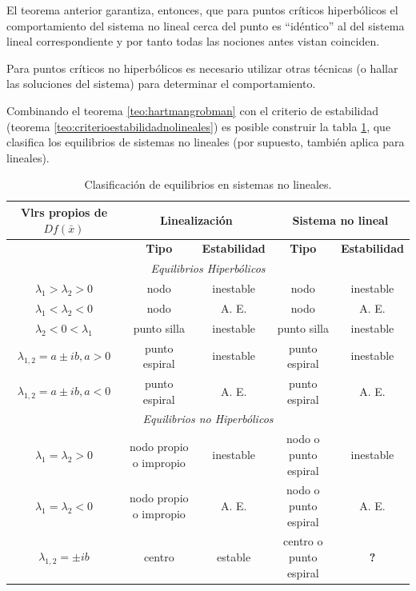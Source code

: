 El teorema anterior garantiza, entonces, que para puntos críticos hiperbólicos el comportamiento del sistema no lineal cerca del punto es ``idéntico'' al del sistema lineal correspondiente y por tanto todas las nociones antes vistan coinciden.

Para puntos críticos no hiperbólicos es necesario utilizar otras técnicas (o hallar las soluciones del sistema) para determinar el comportamiento.

Combinando el teorema \ref{teo:hartmangrobman} con el criterio de estabilidad (teorema \ref{teo:criterioestabilidadnolineales}) es posible construir la tabla \ref{tab:clasificacionequilibrios}, que clasifica los equilibrios de sistemas no lineales (por supuesto, también aplica para lineales).

\begin{table}[ht!]
{\small
	\begin{tabular}{|c|c|c|c|c|}
		\hline
		\textbf{Vlrs propios de $Df(\bar{x})$} & \multicolumn{2}{|c|}{\textbf{Linealización}} & \multicolumn{2}{|c|}{\textbf{Sistema no lineal}} \\
		\hline
		 & \textbf{Tipo} &\textbf{Estabilidad} & \textbf{Tipo} & \textbf{Estabilidad} \\
		\hline
		\multicolumn{5}{|c|}{\textit{Equilibrios Hiperbólicos}} \\
		\hline
		$\lambda_1 > \lambda_2 > 0$ & nodo & inestable & nodo & inestable \\
		$\lambda_1 < \lambda_2 < 0$ & nodo & A. E. & nodo & A. E. \\
		$\lambda_2 < 0 < \lambda_1$ & punto silla & inestable & punto silla & inestable \\
		$\lambda_{1,2} = a \pm ib, a > 0$ & punto espiral & inestable & punto espiral & inestable \\
		$\lambda_{1,2} = a \pm ib, a < 0$ & punto espiral & A. E. & punto espiral & A. E. \\

		\hline
		\multicolumn{5}{|c|}{\textit{Equilibrios no Hiperbólicos}} \\
		\hline
		$\lambda_1 = \lambda_2 >0$ & nodo propio o impropio & inestable & nodo o punto espiral & inestable \\
		$\lambda_1 = \lambda_2 < 0$ & nodo propio o impropio & A. E. & nodo o punto espiral & A. E. \\
		$\lambda_{1,2} = \pm ib$ & centro & estable & centro o punto espiral & \textbf{?} \\
		\hline
	\end{tabular}
}
	\label{tab:clasificacionequilibrios}
	\caption{Clasificación de equilibrios en sistemas no lineales.}
\end{table}
